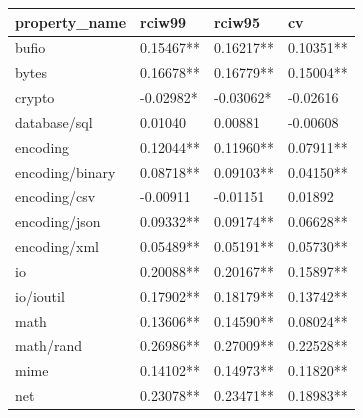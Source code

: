\documentclass{seal_thesis}
\begin{document}
\begin{table}[H]
	\begin{tabular}{@{}llll@{}}
		property\_name & rciw99 & rciw95 & cv \\
		\toprule
		bufio & \cellcolor[HTML]{99CCFF}0.15467** & \cellcolor[HTML]{99CCFF}0.16217** & \cellcolor[HTML]{99CCFF}0.10351** \\
		bytes & \cellcolor[HTML]{99CCFF}0.16678** & \cellcolor[HTML]{99CCFF}0.16779** & \cellcolor[HTML]{99CCFF}0.15004** \\
		crypto & \cellcolor[HTML]{333399}\color{white}-0.02982* & \cellcolor[HTML]{333399}\color{white}-0.03062* & \cellcolor[HTML]{333399}\color{white}-0.02616 \\
		database/sql & \cellcolor[HTML]{333399}\color{white}0.01040 & \cellcolor[HTML]{333399}\color{white}0.00881 & \cellcolor[HTML]{333399}\color{white}-0.00608 \\
		encoding & \cellcolor[HTML]{99CCFF}0.12044** & \cellcolor[HTML]{99CCFF}0.11960** & \cellcolor[HTML]{99CCFF}0.07911** \\
		encoding/binary & \cellcolor[HTML]{99CCFF}0.08718** & \cellcolor[HTML]{99CCFF}0.09103** & \cellcolor[HTML]{3366FF}0.04150** \\
		encoding/csv & \cellcolor[HTML]{333399}\color{white}-0.00911 & \cellcolor[HTML]{333399}\color{white}-0.01151 & \cellcolor[HTML]{3366FF}0.01892 \\
		encoding/json & \cellcolor[HTML]{99CCFF}0.09332** & \cellcolor[HTML]{99CCFF}0.09174** & \cellcolor[HTML]{3366FF}0.06628** \\
		encoding/xml & \cellcolor[HTML]{3366FF}0.05489** & \cellcolor[HTML]{3366FF}0.05191** & \cellcolor[HTML]{3366FF}0.05730** \\
		io & \cellcolor[HTML]{99CCFF}0.20088** & \cellcolor[HTML]{99CCFF}0.20167** & \cellcolor[HTML]{99CCFF}0.15897** \\
		io/ioutil & \cellcolor[HTML]{99CCFF}0.17902** & \cellcolor[HTML]{99CCFF}0.18179** & \cellcolor[HTML]{99CCFF}0.13742** \\
		math & \cellcolor[HTML]{99CCFF}0.13606** & \cellcolor[HTML]{99CCFF}0.14590** & \cellcolor[HTML]{99CCFF}0.08024** \\
		math/rand & \cellcolor[HTML]{FFCC99}0.26986** & \cellcolor[HTML]{FFCC99}0.27009** & \cellcolor[HTML]{C0C0C0}0.22528** \\
		mime & \cellcolor[HTML]{99CCFF}0.14102** & \cellcolor[HTML]{99CCFF}0.14973** & \cellcolor[HTML]{99CCFF}0.11820** \\
		net & \cellcolor[HTML]{C0C0C0}0.23078** & \cellcolor[HTML]{C0C0C0}0.23471** & \cellcolor[HTML]{99CCFF}0.18983** \\

\end{tabular}
\end{table}
\end{document}

